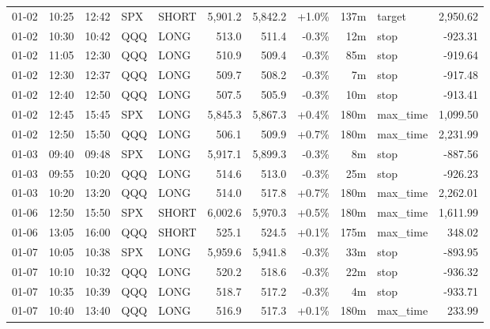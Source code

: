 \documentclass[11pt,a4paper,twoside]{article}
\begin{document}
\begin{center}
\begin{longtable}{>{\color{txtmain}}l l l l l r r r r >{\color{txtmain}}l r}
01-02 & 10:25 & 12:42 & SPX & SHORT & 5,901.2 & 5,842.2 & \textcolor{wingreen}{+1.0\%} & 137m & target & \textcolor{wingreen}{2,950.62} \\
01-02 & 10:30 & 10:42 & QQQ & LONG & 513.0 & 511.4 & \textcolor{lossred}{-0.3\%} & 12m & stop & \textcolor{lossred}{-923.31} \\
01-02 & 11:05 & 12:30 & QQQ & LONG & 510.9 & 509.4 & \textcolor{lossred}{-0.3\%} & 85m & stop & \textcolor{lossred}{-919.64} \\
01-02 & 12:30 & 12:37 & QQQ & LONG & 509.7 & 508.2 & \textcolor{lossred}{-0.3\%} & 7m & stop & \textcolor{lossred}{-917.48} \\
01-02 & 12:40 & 12:50 & QQQ & LONG & 507.5 & 505.9 & \textcolor{lossred}{-0.3\%} & 10m & stop & \textcolor{lossred}{-913.41} \\
01-02 & 12:45 & 15:45 & SPX & LONG & 5,845.3 & 5,867.3 & \textcolor{wingreen}{+0.4\%} & 180m & max\_time & \textcolor{wingreen}{1,099.50} \\
01-02 & 12:50 & 15:50 & QQQ & LONG & 506.1 & 509.9 & \textcolor{wingreen}{+0.7\%} & 180m & max\_time & \textcolor{wingreen}{2,231.99} \\
01-03 & 09:40 & 09:48 & SPX & LONG & 5,917.1 & 5,899.3 & \textcolor{lossred}{-0.3\%} & 8m & stop & \textcolor{lossred}{-887.56} \\
01-03 & 09:55 & 10:20 & QQQ & LONG & 514.6 & 513.0 & \textcolor{lossred}{-0.3\%} & 25m & stop & \textcolor{lossred}{-926.23} \\
01-03 & 10:20 & 13:20 & QQQ & LONG & 514.0 & 517.8 & \textcolor{wingreen}{+0.7\%} & 180m & max\_time & \textcolor{wingreen}{2,262.01} \\
01-06 & 12:50 & 15:50 & SPX & SHORT & 6,002.6 & 5,970.3 & \textcolor{wingreen}{+0.5\%} & 180m & max\_time & \textcolor{wingreen}{1,611.99} \\
01-06 & 13:05 & 16:00 & QQQ & SHORT & 525.1 & 524.5 & \textcolor{wingreen}{+0.1\%} & 175m & max\_time & \textcolor{wingreen}{348.02} \\
01-07 & 10:05 & 10:38 & SPX & LONG & 5,959.6 & 5,941.8 & \textcolor{lossred}{-0.3\%} & 33m & stop & \textcolor{lossred}{-893.95} \\
01-07 & 10:10 & 10:32 & QQQ & LONG & 520.2 & 518.6 & \textcolor{lossred}{-0.3\%} & 22m & stop & \textcolor{lossred}{-936.32} \\
01-07 & 10:35 & 10:39 & QQQ & LONG & 518.7 & 517.2 & \textcolor{lossred}{-0.3\%} & 4m & stop & \textcolor{lossred}{-933.71} \\
01-07 & 10:40 & 13:40 & QQQ & LONG & 516.9 & 517.3 & \textcolor{wingreen}{+0.1\%} & 180m & max\_time & \textcolor{wingreen}{233.99} \\

\end{longtable}
\end{center}
\end{document}

